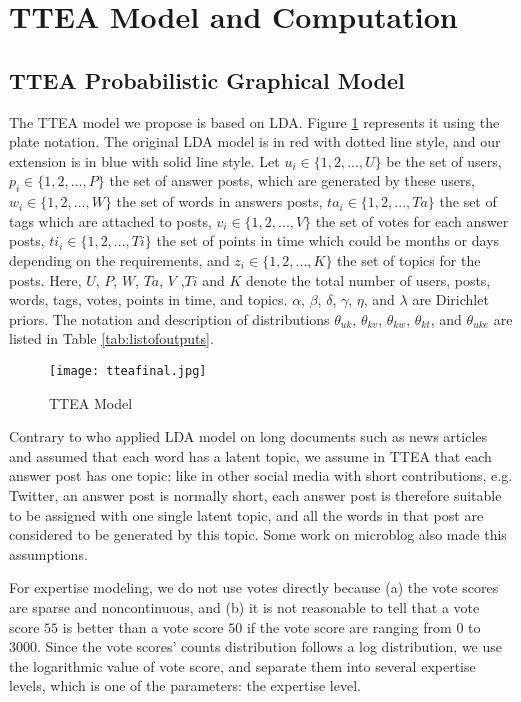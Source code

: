 {{{{{{{\section{TTEA Model and Computation}
\subsection{TTEA Probabilistic Graphical Model}

The TTEA model we propose is based on LDA. Figure \ref{fig:tteamodel} represents it using the plate notation. The original LDA model is in red with dotted line style, and our extension is in blue with solid line style. Let $u_i \in \{1, 2,..., U\}$ be the set of users, $p_i \in \{1, 2,..., P\}$ the set of answer posts, which are generated by these users, $w_i \in \{1, 2,..., W\}$ the set of words in answers posts, $ta_i \in \{1, 2,..., Ta\}$ the set of tags which are attached to posts, $v_i \in \{1, 2,..., V\}$ the set of votes for each answer posts, $ti_i \in \{1, 2,..., Ti\}$ the set of points in time which could be months or days depending on the requirements, and $z_i \in \{1, 2,..., K\}$ the set of topics for the posts. Here, $U$, $P$, $W$, $Ta$, $V$ ,$Ti$ and $K$ denote the total number of users, posts, words, tags, votes, points in time, and topics. $\alpha$, $\beta$, $\delta$, $\gamma$, $\eta$, and $\lambda$ are Dirichlet priors. The notation and description of distributions $\theta_{uk}$, $\theta_{kv}$, $\theta_{kw}$, $\theta_{kt}$, and $\theta_{uke}$ are listed in Table \ref{tab:listofoutputs}.

\begin{figure}
\centering
\texttt{[image: tteafinal.jpg]}  
\caption{TTEA Model}
\label{fig:tteamodel} 
\end{figure}


Contrary to \cite{blei2003latent} who applied LDA model on long documents such as news articles and assumed that each word has a latent topic, we assume in TTEA that each answer post has one topic: like in other social media with short contributions, e.g. Twitter, an answer post is normally short, each answer post is therefore suitable to be assigned with one single latent topic, and all the words in that post are considered to be generated by this topic. Some work\cite{chp7zhao2011comparing}\cite{chp7diao2012finding} on microblog also made this assumptions.

For expertise modeling, we do not use votes directly because (a) the vote scores are sparse and noncontinuous, and (b) it is not reasonable to tell that a vote score $55$ is better than a vote score $50$ if the vote score are ranging from $0$ to $3000$.  Since the vote scores' counts distribution follows a log distribution\cite{yang2013cqarank}, we use the logarithmic value of vote score, and separate them into several expertise levels, which is one of the parameters: the expertise level.

}}}}}}}
